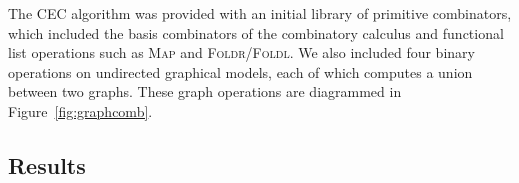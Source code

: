 \documentclass{article} %
\begin{document}
The CEC algorithm was provided with an initial library of primitive  combinators, which included the basis combinators of the combinatory calculus and functional list operations such as \textsc{Map} and \textsc{Foldr}/\textsc{Foldl}. We also included four binary operations on undirected graphical models, each of which computes a union between two graphs. These graph operations are diagrammed in Figure~\ref{fig:graphcomb}.




\subsection{Results}
\end{document}
